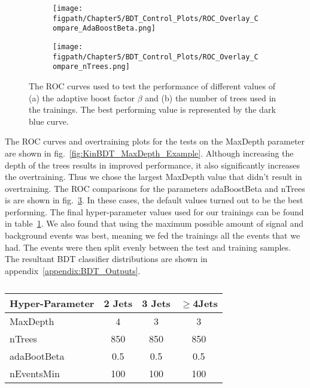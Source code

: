 \begin{figure}[!hbt]
    \centering
    \begin{subfigure}[t]{0.48\textwidth}
        \texttt{[image: \\figpath/Chapter5/BDT\_Control\_Plots/ROC\_Overlay\_Compare\_AdaBoostBeta.png]}
        \caption{}
        \label{fig:KinBDT_ROC_AdaBoostBeta}
    \end{subfigure}
    \begin{subfigure}[t]{0.48\textwidth}
        \texttt{[image: \\figpath/Chapter5/BDT\_Control\_Plots/ROC\_Overlay\_Compare\_nTrees.png]}
        \caption{}
        \label{fig:KinBDT_ROC_nTrees}
    \end{subfigure}
    \caption{The ROC curves used to test the performance of different values of (a) the adaptive boost factor $\beta$ and (b) the number of trees used in the trainings. The best performing value is represented by the dark blue curve.}
    \label{fig:KinBDT_AdaBoostBeta_nTrees_Example}
\end{figure}

The ROC curves and overtraining plots for the tests on the MaxDepth parameter are shown in fig.~\ref{fig:KinBDT_MaxDepth_Example}.
Although increasing the depth of the trees results in improved performance, it also significantly increases the overtraining.
Thus we chose the largest MaxDepth value that didn't result in overtraining.
The ROC comparisons for the parameters adaBoostBeta and nTrees is are shown in fig.~\ref{fig:KinBDT_AdaBoostBeta_nTrees_Example}.
In these cases, the default values turned out to be the best performing.
The final hyper-parameter values used for our trainings can be found in table~\ref{tab:BDT_hyper-parameter_values}.
We also found that using the maximum possible amount of signal and background events was best, meaning we fed the trainings all the events that we had.
The events were then split evenly between the test and training samples.
The resultant BDT classifier distributions are shown in appendix~\ref{appendix:BDT_Outputs}.

\begin{table}[htbp]
\centering
\begin{tabular}{lccc} \hline
\textbf{Hyper-Parameter} & \textbf{2 Jets} & \textbf{3 Jets} & \textbf{$\geqslant$4Jets} \\\hline
MaxDepth    & 4   & 3   & 3 \\
nTrees      & 850 & 850 & 850 \\
adaBootBeta & 0.5 & 0.5 & 0.5 \\
nEventsMin  & 100 & 100 & 100 \\\hline
\end{tabular}
\caption{}
\label{tab:BDT_hyper-parameter_values}
\end{table}

